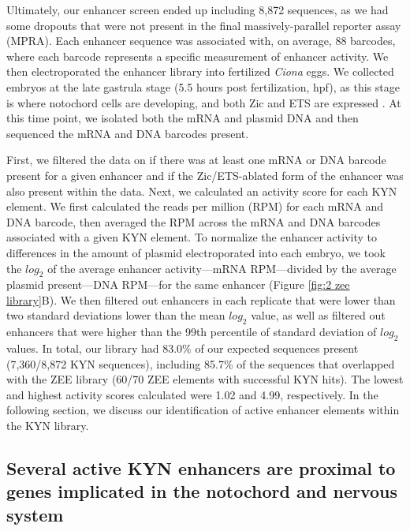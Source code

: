 Ultimately, our enhancer screen ended up including 8,872 sequences, as we had some dropouts that were not present in the final massively-parallel reporter assay (MPRA). Each enhancer sequence was associated with, on average, 88 barcodes, where each barcode represents a specific measurement of enhancer activity. We then electroporated the enhancer library into fertilized \textit{Ciona} eggs. We collected embryos at the late gastrula stage (5.5 hours post fertilization, hpf), as this stage is where notochord cells are developing, and both Zic and ETS are expressed \cite{dykes2018,matsumoto2007a,song2022}. At this time point, we isolated both the mRNA and plasmid DNA and then sequenced the mRNA and DNA barcodes present. 

First, we filtered the data on if there was at least one mRNA or DNA barcode present for a given enhancer and if the Zic/ETS-ablated form of the enhancer was also present within the data. Next, we calculated an activity score for each KYN element. We first calculated the reads per million (RPM) for each mRNA and DNA barcode, then averaged the RPM across the mRNA and DNA barcodes associated with a given KYN element. To normalize the enhancer activity to differences in the amount of plasmid electroporated into each embryo, we took the $log_2$ of the average enhancer activity—mRNA RPM—divided by the average plasmid present—DNA RPM—for the same enhancer (Figure \ref{fig:2 zee library}B). We then filtered out enhancers in each replicate that were lower than two standard deviations lower than the mean $log_2$ value, as well as filtered out enhancers that were higher than the 99th percentile of standard deviation of $log_2$ values. In total, our library had 83.0\% of our expected sequences present (7,360/8,872 KYN sequences), including 85.7\% of the sequences that overlapped with the ZEE library (60/70 ZEE elements with successful KYN hits). The lowest and highest activity scores calculated were 1.02 and 4.99, respectively. In the following section, we discuss our identification of active enhancer elements within the KYN library.

\subsection{Several active KYN enhancers are proximal to genes implicated in the notochord and nervous system}

